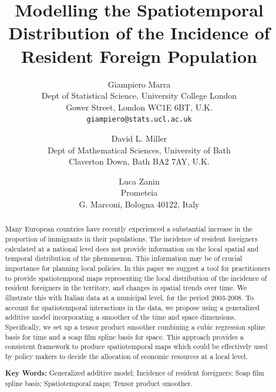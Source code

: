 \documentclass[12pt]{article}
\theoremstyle{definition}
\theoremstyle{plain}
\begin{document}
\title{Modelling the Spatiotemporal Distribution of the Incidence of Resident Foreign Population}

\author{
Giampiero Marra \\ \small Dept of Statistical Science, University College London \\ \small Gower Street, London WC1E 6BT, U.K. 
\\ \small \texttt{giampiero@stats.ucl.ac.uk}
 \and
David L. Miller \\ \small Dept of Mathematical Sciences, University of Bath \\ \small Claverton Down, Bath BA2 7AY, U.K.
 \and
Luca Zanin \\ \small Prometeia \\ \small G. Marconi, Bologna 40122, Italy
}
\date{}

\maketitle


\begin{abstract}

Many European countries have recently experienced a substantial increase in the proportion of immigrants in their populations. The incidence of resident foreigners calculated at a national level does not provide information on the local spatial and temporal distribution of the phenomenon. This information may be of crucial importance for planning local policies. In this paper we suggest a tool for practitioners to provide spatiotemporal maps representing the local distribution of the incidence of resident foreigners in the territory, and changes in spatial trends over time. We illustrate this with Italian data at a municipal level, for the period 2003-2008. To account for spatiotemporal interactions in the data, we propose using a generalized additive model incorporating a smoother of the time and space dimensions. Specifically, we set up a tensor product smoother combining a cubic regression spline basis for time and a soap film spline basis for space. This approach provides a consistent framework to produce spatiotemporal maps which could be effectively used by policy makers to decide the allocation of economic resources at a local level.

\vspace{0.4cm}
\noindent \textbf{Key Words:} Generalized additive model; Incidence of resident foreigners; Soap film spline basis; Spatiotemporal maps; Tensor product smoother. 


\end{abstract}
\end{document}
